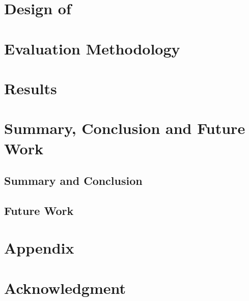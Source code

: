 \documentclass[conference]{IEEEtran}
\begin{document}
\section{Design of \parlot}
\label{sec:design}


\section{Evaluation Methodology}
\label{sec:evalmeth}


\section{Results}
\label{sec:results}

%
%
%


    

\section{Summary, Conclusion and Future Work}
\subsection{Summary and Conclusion}
\subsection{Future Work}


\section{Appendix}

  
\section*{Acknowledgment}



\end{document}
